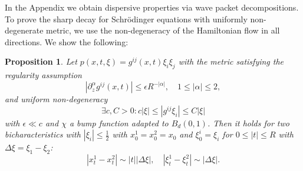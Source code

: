 \documentclass{amsart}
\newtheorem{proposition}[theorem]{Proposition}
\theoremstyle{definition}
\begin{document}
In the Appendix we obtain dispersive properties via wave packet decompositions. To prove the sharp decay for Schr\"odinger equations with uniformly non-degenerate metric, we use the non-degeneracy of the Hamiltonian flow in all directions.
We show the following:
\begin{proposition}
\label{prop:NonDegeneracyFlowSEQ}
Let $p(x,t,\xi) = g^{ij}(x,t) \xi_i \xi_j$ with the metric satisfying the regularity assumption
\begin{equation}
\label{eq:RegularityMetricSEQ}
|\partial_z^{\alpha} g^{ij}(x,t)| \leq 
\epsilon R^{-|\alpha|}, \quad 1 \leq |\alpha| \leq 2, 
\end{equation}
and uniform non-degeneracy
\begin{equation}
\label{eq:NonDegeneracySEQ} 
\exists c, C > 0: c |\xi| \leq |g^{ij} \xi_i| \leq C |\xi|
\end{equation}
with $\epsilon \ll c$ and $\chi$ a bump function adapted to $B_d(0,1)$. Then it holds for two bicharacteristics with $|\xi_i| \leq \frac{1}{2}$ with $x_0^1 = x_0^2 = x_0$ and $\xi_0^i = \xi_i$ for $0 \leq |t| \leq R$ with $\Delta \xi = \xi_1 - \xi_2$:
\begin{equation*}
|x_t^1 - x_t^2| \sim |t| |\Delta \xi|, \quad |\xi_t^1 - \xi_t^2| \sim |\Delta \xi|.
\end{equation*}
\end{proposition}
\end{document}
